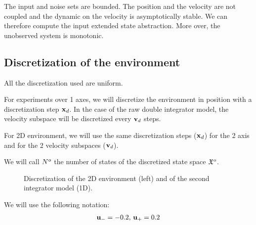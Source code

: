 The input and noise sets are bounded. The position and the velocity are not coupled and the dynamic on the velocity is asymptotically stable.
We can therefore compute the input extended state abstraction. More over, the unobserved system is monotonic.

\subsection{Discretization of the environment}
All the discretization used are uniform.

For experiments over 1 axes, we will discretize the environment in position with a discretization step $ \mathbf{x}_d$. In the case of the raw double integrator model, the velocity subspace will be discretized every $ \mathbf{v}_d$ steps.

For 2D environment, we will use the same discretization steps ($ \mathbf{x}_d$) for the 2 axis and for the 2 velocity subspaces ($ \mathbf{v}_d$).

We will call $N^o$ the number of states of the discretized state space $\mathfrak{X}^o$.

\begin{figure}
\centering
\begin{minipage}[b]{0.49\linewidth}

\end{minipage}
\begin{minipage}[b]{0.49\linewidth}

\end{minipage}
\caption{Discretization of the 2D environment (left) and of the second integrator model (1D).}
\end{figure}

We will use the following notation:
\begin{equation}
\begin{split}
 \mathbf{u}_{-} = -0.2
\textrm{, }
 \mathbf{u}_{+} = 0.2
\end{split}
\end{equation}
